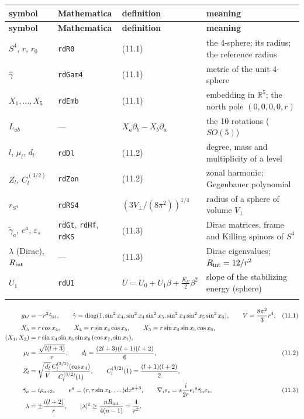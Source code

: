 \documentclass[10pt,a4paper]{article}
\begin{document}
{\footnotesize
\begin{longtable}{>{\raggedright\arraybackslash}p{}>{\raggedright\arraybackslash}p{}>{\raggedright\arraybackslash}p{}>{\raggedright\arraybackslash}p{}}
\toprule
\textbf{symbol} & \textbf{Mathematica} & \textbf{definition} & \textbf{meaning} \\
\midrule\endfirsthead
\toprule
\textbf{symbol} & \textbf{Mathematica} & \textbf{definition} & \textbf{meaning} \\
\midrule\endhead
\endfoot
\bottomrule\endlastfoot
$S^4$, $r$, $r_0$ & \texttt{rdR0} & (11.1) & the 4-sphere; its radius; the reference radius \\
$\hat\gamma$ & \texttt{rdGam4} & (11.1) & metric of the unit 4-sphere \\
$X_1,\dots,X_5$ & \texttt{rdEmb} & (11.1) & embedding in $\mathbb R^5$; the north pole $(0,0,0,0,r)$ \\
$L_{ab}$ & — & $X_a\partial_b-X_b\partial_a$ & the 10 rotations ($SO(5)$) \\
$l$, $\mu_l$, $d_l$ & \texttt{rdDl} & (11.2) & degree, mass and multiplicity of a level \\
$Z_l$, $C_l^{(3/2)}$ & \texttt{rdZon} & (11.2) & zonal harmonic; Gegenbauer polynomial \\
$r_{S^4}$ & \texttt{rdRS4} & $(3V_\perp/(8\pi^2))^{1/4}$ & radius of a sphere of volume $V_\perp$ \\
$\tilde\gamma_a$, $e^a$, $\varepsilon_s$ & \texttt{rdGt}, \texttt{rdHf}, \texttt{rdKS} & (11.3) & Dirac matrices, frame and Killing spinors of $S^4$ \\
$\lambda$ (Dirac), $R_{\rm int}$ & — & (11.3) & Dirac eigenvalues; $R_{\rm int}=12/r^2$ \\
$U_1$ & \texttt{rdU1} & $U=U_0+U_1\beta+\frac{K_U}2\beta^2$ & slope of the stabilizing energy (sphere) \\*
\end{longtable}}
\begin{align*}
g_{kl}&=-r^2\hat\gamma_{kl},\qquad \hat\gamma=\mathrm{diag}(1,\sin^2x_4,\sin^2x_4\sin^2x_5,\sin^2x_4\sin^2x_5\sin^2x_6),\qquad V=\frac{8\pi^2}3r^4,&&(11.1) \\
X_5&=r\cos x_4,\qquad X_4=r\sin x_4\cos x_5,\qquad X_3=r\sin x_4\sin x_5\cos x_6, \\
(X_1,X_2)&=r\sin x_4\sin x_5\sin x_6\,(\cos x_7,\sin x_7), \\
\mu_l&=\frac{\sqrt{l(l+3)}}r,\qquad d_l=\frac{(2l+3)(l+1)(l+2)}6,&&(11.2) \\
Z_l&=\sqrt{\frac{d_l}V}\frac{C_l^{(3/2)}(\cos x_4)}{C_l^{(3/2)}(1)},\qquad C_l^{(3/2)}(1)=\frac{(l+1)(l+2)}2, \\
\tilde\gamma_a&=i\rho_{a+3},\qquad e^a=(r,r\sin x_4,\dots)dx^{a+3},\qquad \nabla_i\varepsilon_s=s\frac i{2r}e_i{}^a\tilde\gamma_a\varepsilon_s,&&(11.3) \\
\lambda&=\pm\frac{i(l+2)}r,\qquad |\lambda|^2\ge\frac{nR_{\rm int}}{4(n-1)}=\frac4{r^2}.
\end{align*}
\end{document}
